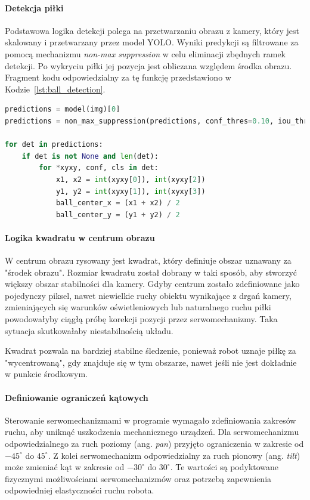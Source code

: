 \documentclass[a4paper,twoside,12pt]{book}
\begin{document}
\paragraph{Detekcja piłki}
Podstawowa logika detekcji polega na przetwarzaniu obrazu z kamery, który jest skalowany i przetwarzany przez model YOLO. Wyniki predykcji są filtrowane za pomocą mechanizmu \textit{non-max suppression} w celu eliminacji zbędnych ramek detekcji. Po wykryciu piłki jej pozycja jest obliczana względem środka obrazu. Fragment kodu odpowiedzialny za tę funkcję przedstawiono w Kodzie~\ref{lst:ball_detection}.

\begin{lstlisting}[language=Python, caption={Logika detekcji piłki przy użyciu modelu YOLO.}, label={lst:ball_detection}, captionpos=b]
predictions = model(img)[0]
predictions = non_max_suppression(predictions, conf_thres=0.10, iou_thres=0.45)

for det in predictions:
    if det is not None and len(det):
        for *xyxy, conf, cls in det:
            x1, x2 = int(xyxy[0]), int(xyxy[2])
            y1, y2 = int(xyxy[1]), int(xyxy[3])
            ball_center_x = (x1 + x2) / 2
            ball_center_y = (y1 + y2) / 2
\end{lstlisting}

\newpage
\paragraph{Logika kwadratu w centrum obrazu}
W centrum obrazu rysowany jest kwadrat, który definiuje obszar uznawany za "środek obrazu". Rozmiar kwadratu został dobrany w taki sposób, aby stworzyć większy obszar stabilności dla kamery. Gdyby centrum zostało zdefiniowane jako pojedynczy piksel, nawet niewielkie ruchy obiektu wynikające z drgań kamery, zmieniających się warunków oświetleniowych lub naturalnego ruchu piłki powodowałyby ciągłą próbę korekcji pozycji przez serwomechanizmy. Taka sytuacja skutkowałaby niestabilnością układu.

Kwadrat pozwala na bardziej stabilne śledzenie, ponieważ robot uznaje piłkę za "wycentrowaną", gdy znajduje się w tym obszarze, nawet jeśli nie jest dokładnie w punkcie środkowym.

\paragraph{Definiowanie ograniczeń kątowych}
Sterowanie serwomechanizmami w programie wymagało zdefiniowania zakresów ruchu, aby uniknąć uszkodzenia mechanicznego urządzeń. Dla serwomechanizmu odpowiedzialnego za ruch poziomy (ang. \textit{pan}) przyjęto ograniczenia w zakresie od $-45^{\circ}$ do $45^{\circ}$. Z kolei serwomechanizm odpowiedzialny za ruch pionowy (ang. \textit{tilt}) może zmieniać kąt w zakresie od $-30^{\circ}$ do $30^{\circ}$. Te wartości są podyktowane fizycznymi możliwościami serwomechanizmów oraz potrzebą zapewnienia odpowiedniej elastyczności ruchu robota.
\end{document}
